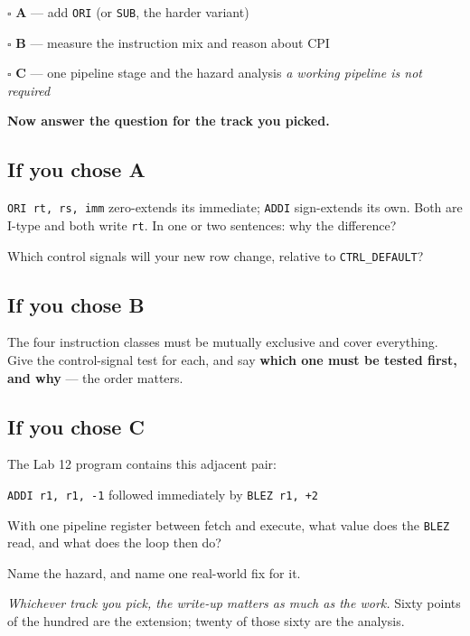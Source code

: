 \documentclass[11pt]{article}
\newcommand{\code}[1]{\texttt{#1}}
\newcommand{\answerbox}[1]{\vspace{2pt}\fbox{\parbox[c][#1][c]{\dimexpr\linewidth-2\fboxsep-2\fboxrule}{\ }}\vspace{4pt}}
\begin{document}
\vspace{4pt}
$\square$ \textbf{A} --- add \code{ORI} (or \code{SUB}, the harder variant)

$\square$ \textbf{B} --- measure the instruction mix and reason about CPI

$\square$ \textbf{C} --- one pipeline stage and the hazard analysis
\hfill {\small\emph{a working pipeline is not required}}
\vspace{8pt}

\textbf{Now answer the question for the track you picked.}

\subsection*{If you chose A}

\code{ORI rt, rs, imm} zero-extends its immediate; \code{ADDI} sign-extends its
own. Both are I-type and both write \code{rt}. In one or two sentences: why the
difference?

\answerbox{2.0cm}

Which control signals will your new row change, relative to \code{CTRL\_DEFAULT}?

\answerbox{2.0cm}

\subsection*{If you chose B}

The four instruction classes must be mutually exclusive and cover everything.
Give the control-signal test for each, and say \textbf{which one must be tested
first, and why} --- the order matters.

\answerbox{3.0cm}

\subsection*{If you chose C}

The Lab 12 program contains this adjacent pair:

\begin{center}
\code{ADDI r1, r1, -1} \quad followed immediately by \quad \code{BLEZ r1, +2}
\end{center}

With one pipeline register between fetch and execute, what value does the
\code{BLEZ} read, and what does the loop then do?

\answerbox{2.4cm}

Name the hazard, and name one real-world fix for it.

\answerbox{1.6cm}

\vfill
{\small \emph{Whichever track you pick, the write-up matters as much as the work.}
Sixty points of the hundred are the extension; twenty of those sixty are the
analysis.}
\end{document}
